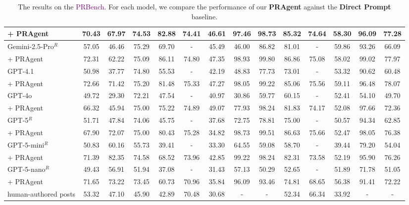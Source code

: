 \begin{table*}[t!]
{\begin{tabular}{l|cc|cccccc|cccc|c}
\rowcolor[rgb]{0.928, 0.936, 0.997}
+ PRAgent & 70.43 & 67.97 & 74.53 & 82.88 & 74.41 & 46.61 & 97.46 & 98.73 & 85.32 & 74.64 & 58.30 & 96.09 & 77.28 \\
\midrule
Gemini-2.5-Pro$^{R}$ & 57.05 & 46.46 & 75.29 & 69.70 & - & 45.49 & 46.00 & 86.82 & 81.01 & - & 59.86 & 93.26 & 66.09 \\
\rowcolor[rgb]{0.928, 0.936, 0.997}
+ PRAgent & 72.31 & 62.22 & 75.09 & 86.11 & 74.80 & 47.35 & 98.93 & 99.80 & 86.86 & 75.08 & 58.02 & 99.02 & 77.97 \\
\midrule
GPT-4.1 & 50.98 & 37.77 & 74.80 & 55.53 & - & 42.19 & 48.83 & 77.73 & 73.01 & - & 53.32 & 90.62 & 60.48 \\
\rowcolor[rgb]{0.928, 0.936, 0.997}
+ PRAgent & 72.66 & 71.42 & 75.20 & 81.48 & 75.33 & 47.27 & 98.05 & 99.22 & 85.06 & 75.56 & 59.11 & 96.48 & 78.07 \\
\midrule
GPT-4o & 49.72 & 29.30 & 72.21 & 47.54 & - & 40.97 & 30.86 & 59.77 & 60.15 & - & 52.41 & 54.10 & 49.70 \\
\rowcolor[rgb]{0.928, 0.936, 0.997}
+ PRAgent & 66.32 & 45.94 & 75.00 & 75.22 & 74.89 & 49.07 & 77.93 & 98.24 & 81.83 & 74.17 & 52.08 & 97.66 & 72.36 \\
\midrule
GPT-5$^{R}$ & 51.71 & 47.84 & 74.06 & 45.75 & - & 37.68 & 72.75 & 78.81 & 75.00 & - & 50.57 & 94.34 & 62.85 \\
\rowcolor[rgb]{0.928, 0.936, 0.997}
+ PRAgent & 67.90 & 72.07 & 75.00 & 80.43 & 75.28 & 34.82 & 98.73 & 99.51 & 86.63 & 75.66 & 52.47 & 98.05 & 76.38 \\
\midrule
GPT-5-mini$^{R}$ & 50.83 & 60.16 & 55.73 & 39.41 & - & 33.30 & 64.55 & 59.08 & 58.70 & - & 39.44 & 79.20 & 54.04 \\
\rowcolor[rgb]{0.928, 0.936, 0.997}
+ PRAgent & 71.39 & 82.35 & 74.58 & 68.52 & 73.96 & 42.85 & 99.22 & 98.24 & 82.31 & 73.58 & 52.19 & 95.90 & 76.26 \\
\midrule
GPT-5-nano$^{R}$ & 49.43 & 56.91 & 51.94 & 37.08 & - & 31.43 & 57.13 & 50.29 & 52.65 & - & 51.89 & 71.78 & 51.05 \\
\rowcolor[rgb]{0.928, 0.936, 0.997}
+ PRAgent & 71.65 & 73.22 & 73.45 & 60.73 & 70.96 & 35.84 & 96.09 & 93.46 & 74.81 & 68.65 & 56.38 & 91.41 & 72.22 \\
\midrule
\rowcolor[rgb]{0.997, 0.936, 0.928}
human-authored posts & 53.32 & 47.10 & 45.90 & 42.89 & 70.48 & 30.68 & - & - & 52.34 & 66.34 & 33.92 & - & - \\
\bottomrule
\end{tabular}%
}
\caption{The results on the \textcolor{purple}{PRBench}. For each model, we compare the performance of our \textbf{PRAgent} against the \textbf{Direct Prompt} baseline.}
\label{tab:pragent-full}
\end{table*}





